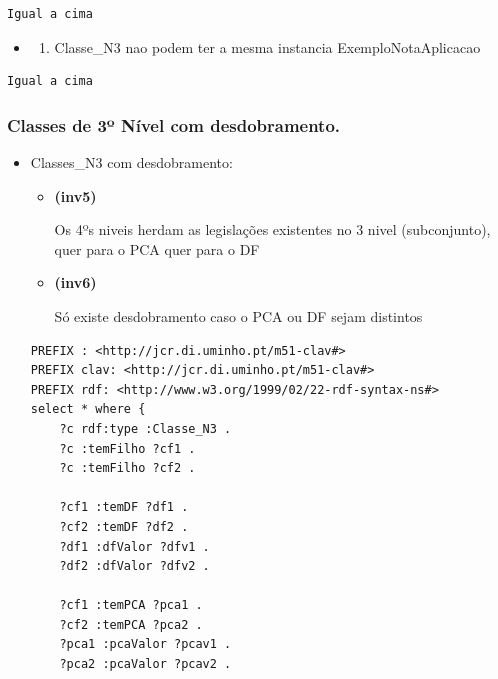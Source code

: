 \documentclass[tikz,runningheads,a4paper]{llncs}
\begin{document}
\begin{subappendices}
\begin{lstlisting}[language=sparql, frame=single, basicstyle=\scriptsize]
Igual a cima
\end{lstlisting}

\begin{itemize}
\item
  \begin{enumerate}
  \def\labelenumi{(\arabic{enumi})}
  \setcounter{enumi}{23}
  \tightlist
  \item
    Classe\_N3 nao podem ter a mesma instancia ExemploNotaAplicacao
  \end{enumerate}
\end{itemize}

\begin{lstlisting}[language=sparql, frame=single, basicstyle=\scriptsize]
Igual a cima
\end{lstlisting}

\hypertarget{classes-de-3-nivel-com-desdobramento}{%
\subsubsection{Classes de 3º Nível com
desdobramento.}\label{classes-de-3uxba-nuxedvel-com-desdobramento.}}

\begin{itemize}
\tightlist
\item
  Classes\_N3 com desdobramento:

  \begin{itemize}
  \tightlist
  \item
    \hypertarget{inv5}{\textbf{(inv5)}} Os 4ºs niveis herdam as legislações existentes no 3
    nivel (subconjunto), quer para o PCA quer para o DF
  \item
    \hypertarget{inv6}{\textbf{(inv6)}} Só existe desdobramento caso o PCA ou DF sejam
    distintos
  \end{itemize}

\begin{lstlisting}[language=sparql, frame=single, basicstyle=\scriptsize]
PREFIX : <http://jcr.di.uminho.pt/m51-clav#>
PREFIX clav: <http://jcr.di.uminho.pt/m51-clav#>
PREFIX rdf: <http://www.w3.org/1999/02/22-rdf-syntax-ns#>
select * where {
    ?c rdf:type :Classe_N3 .
    ?c :temFilho ?cf1 .
    ?c :temFilho ?cf2 .

    ?cf1 :temDF ?df1 .
    ?cf2 :temDF ?df2 .
    ?df1 :dfValor ?dfv1 .
    ?df2 :dfValor ?dfv2 .

    ?cf1 :temPCA ?pca1 .
    ?cf2 :temPCA ?pca2 .
    ?pca1 :pcaValor ?pcav1 .
    ?pca2 :pcaValor ?pcav2 .


\end{lstlisting}
\end{itemize}
\end{subappendices}
\end{document}
